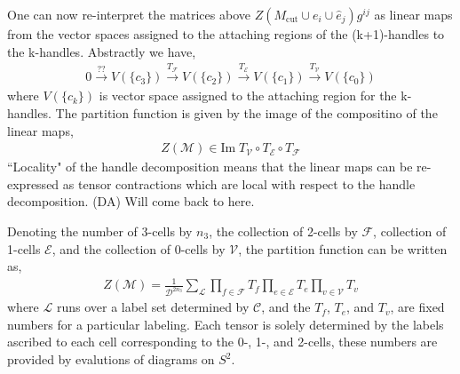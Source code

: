 \documentclass[12pt,a4paper]{article}
\newcounter{arrow}
\newcommand{\tp}{\otimes}
\newcommand{\mce}{\mathcal{E}}
\newcommand{\mcd}{\mathcal{D}}
\newcommand{\mcl}{\mathcal{L}}
\newcommand{\mcc}{\mathcal{C}}
\newcommand{\mcm}{\mathcal{M}}
\newcommand{\mcv}{\mathcal{V}}
\newcommand{\mcf}{\mathcal{F}}
\newcommand{\kw}[1]{{\color{kwcolor}\footnotesize{(KW) #1}}}
\newcommand{\dave}[1]{{\color{ao(english)}\footnotesize{(DA) #1}}}
\begin{document}
One can now re-interpret the matrices above $Z(M_{\text{cut}} \cup e_i \cup \hat{e}_j)g^{ij}$ as linear maps from the vector spaces assigned to 
the attaching regions of the (k+1)-handles to the k-handles. 
Abstractly we have,
\begin{align}\nonumber
0 \xrightarrow{??}V(\{ c_3 \}) \xrightarrow{T_{\mcf}} V(\{ c_2 \})  \xrightarrow{T_{\mce}} V(\{ c_1 \})  \xrightarrow{T_{\mcv}} V(\{ c_0 \}) 
\end{align}
where $V(\{c_k \})$ is vector space assigned to the attaching region for the k-handles. 
The partition function is given by the image of the compositino of the linear maps,
\begin{align}
Z(\mcm) \in \text{Im} \; T_{\mcv} \circ T_{\mce} \circ T_{\mcf}
\end{align}
``Locality" of the handle decomposition means that the linear maps can be re-expressed as tensor contractions which are local with respect to the handle decomposition.
\dave{Will come back to here.}


Denoting the number of 3-cells by $n_3$, the collection of 2-cells by $\mcf$, 
collection of 1-cells $\mce$, and the collection of 0-cells by $\mcv$, 
the partition function can be written as,
\begin{align}
Z(\mcm) = \frac{1}{\mcd^{2 n_3}}\sum_{\mcl} \prod_{f \in \mcf} T_f \prod_{e \in \mce} T_e \prod_{v \in \mcv} T_v
\label{TVBWss}
\end{align}
where $\mcl$ runs over a label set determined by $\mcc$, 
and the $T_f$, $T_e$, and $T_v$, 
are fixed numbers for a particular labeling. 
Each tensor is solely determined by the labels ascribed to each cell corresponding to the 0-, 1-, and 2-cells,
these numbers are provided by evalutions of diagrams on $S^2$.
\end{document}
